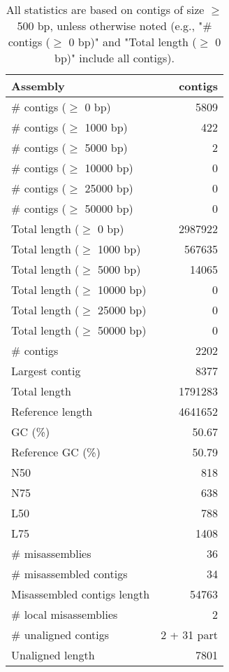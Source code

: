 \documentclass[12pt,a4paper]{article}
\begin{document}
\begin{table}[ht]
\begin{center}
\caption{All statistics are based on contigs of size $\geq$ 500 bp, unless otherwise noted (e.g., "\# contigs ($\geq$ 0 bp)" and "Total length ($\geq$ 0 bp)" include all contigs).}
\begin{tabular}{|l*{1}{|r}|}
\hline
Assembly & contigs \\ \hline
\# contigs ($\geq$ 0 bp) & 5809 \\ \hline
\# contigs ($\geq$ 1000 bp) & 422 \\ \hline
\# contigs ($\geq$ 5000 bp) & 2 \\ \hline
\# contigs ($\geq$ 10000 bp) & 0 \\ \hline
\# contigs ($\geq$ 25000 bp) & 0 \\ \hline
\# contigs ($\geq$ 50000 bp) & 0 \\ \hline
Total length ($\geq$ 0 bp) & 2987922 \\ \hline
Total length ($\geq$ 1000 bp) & 567635 \\ \hline
Total length ($\geq$ 5000 bp) & 14065 \\ \hline
Total length ($\geq$ 10000 bp) & 0 \\ \hline
Total length ($\geq$ 25000 bp) & 0 \\ \hline
Total length ($\geq$ 50000 bp) & 0 \\ \hline
\# contigs & 2202 \\ \hline
Largest contig & 8377 \\ \hline
Total length & 1791283 \\ \hline
Reference length & 4641652 \\ \hline
GC (\%) & 50.67 \\ \hline
Reference GC (\%) & 50.79 \\ \hline
N50 & 818 \\ \hline
N75 & 638 \\ \hline
L50 & 788 \\ \hline
L75 & 1408 \\ \hline
\# misassemblies & 36 \\ \hline
\# misassembled contigs & 34 \\ \hline
Misassembled contigs length & 54763 \\ \hline
\# local misassemblies & 2 \\ \hline
\# unaligned contigs & 2 + 31 part \\ \hline
Unaligned length & 7801 \\ \hline

\end{tabular}
\end{center}
\end{table}
\end{document}
